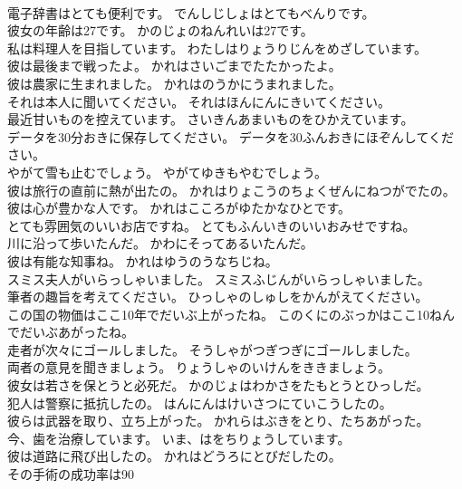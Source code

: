\documentclass[8pt]{extreport}
\begin{document}
\begin{CJK}{UTF8}{min}
\\	電子辞書はとても便利です。	でんしじしょはとてもべんりです。 
\\	彼女の年齢は27です。	かのじょのねんれいは27です。 
\\	私は料理人を目指しています。	わたしはりょうりじんをめざしています。 
\\	彼は最後まで戦ったよ。	かれはさいごまでたたかったよ。 
\\	彼は農家に生まれました。	かれはのうかにうまれました。 
\\	それは本人に聞いてください。	それはほんにんにきいてください。 
\\	最近甘いものを控えています。	さいきんあまいものをひかえています。 
\\	データを30分おきに保存してください。	データを30ふんおきにほぞんしてください。 
\\	やがて雪も止むでしょう。	やがてゆきもやむでしょう。 
\\	彼は旅行の直前に熱が出たの。	かれはりょこうのちょくぜんにねつがでたの。 
\\	彼は心が豊かな人です。	かれはこころがゆたかなひとです。 
\\	とても雰囲気のいいお店ですね。	とてもふんいきのいいおみせですね。 
\\	川に沿って歩いたんだ。	かわにそってあるいたんだ。 
\\	彼は有能な知事ね。	かれはゆうのうなちじね。 
\\	スミス夫人がいらっしゃいました。	スミスふじんがいらっしゃいました。 
\\	筆者の趣旨を考えてください。	ひっしゃのしゅしをかんがえてください。 
\\	この国の物価はここ10年でだいぶ上がったね。	このくにのぶっかはここ10ねんでだいぶあがったね。 
\\	走者が次々にゴールしました。	そうしゃがつぎつぎにゴールしました。 
\\	両者の意見を聞きましょう。	りょうしゃのいけんをききましょう。 
\\	彼女は若さを保とうと必死だ。	かのじょはわかさをたもとうとひっしだ。 
\\	犯人は警察に抵抗したの。	はんにんはけいさつにていこうしたの。 
\\	彼らは武器を取り、立ち上がった。	かれらはぶきをとり、たちあがった。 
\\	今、歯を治療しています。	いま、はをちりょうしています。 
\\	彼は道路に飛び出したの。	かれはどうろにとびだしたの。 
\\	その手術の成功率は90

\end{CJK}
\end{document}
